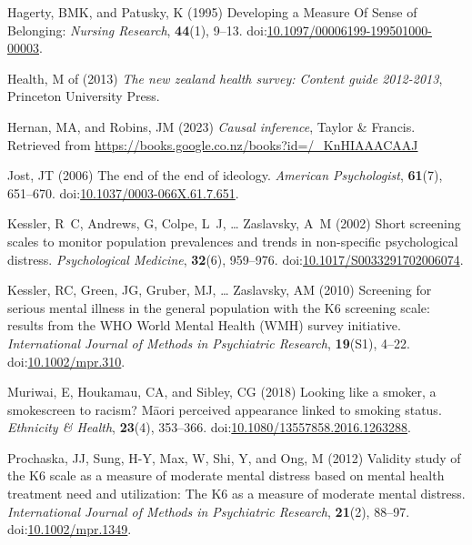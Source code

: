\documentclass[
  singlecolumn,
  9pt]{article}
\newlength{\cslhangindent}
\newenvironment{CSLReferences}[2] %
 {\begin{list}{}{%
  \setlength{\itemindent}{0pt}
  \setlength{\leftmargin}{0pt}
  \setlength{\parsep}{0pt}
  \ifodd #1
   \setlength{\leftmargin}{\cslhangindent}
   \setlength{\itemindent}{-1\cslhangindent}
  \fi
  \setlength{\itemsep}{#2\baselineskip}}}
 {\end{list}}
\begin{document}
\begin{CSLReferences}{1}{0}
Hagerty, BMK, and Patusky, K (1995) Developing a Measure Of Sense of
Belonging: \emph{Nursing Research}, \textbf{44}(1), 9--13.
doi:\href{https://doi.org/10.1097/00006199-199501000-00003}{10.1097/00006199-199501000-00003}.

Health, M of (2013) \emph{The new zealand health survey: Content guide
2012-2013}, Princeton University Press.

Hernan, MA, and Robins, JM (2023) \emph{Causal inference}, Taylor \&
Francis. Retrieved from
\url{https://books.google.co.nz/books?id=/_KnHIAAACAAJ}

Jost, JT (2006) The end of the end of ideology. \emph{American
Psychologist}, \textbf{61}(7), 651--670.
doi:\href{https://doi.org/10.1037/0003-066X.61.7.651}{10.1037/0003-066X.61.7.651}.

Kessler, R~C, Andrews, G, Colpe, L~J, \ldots{} Zaslavsky, A~M (2002)
Short screening scales to monitor population prevalences and trends in
non-specific psychological distress. \emph{Psychological Medicine},
\textbf{32}(6), 959--976.
doi:\href{https://doi.org/10.1017/S0033291702006074}{10.1017/S0033291702006074}.

Kessler, RC, Green, JG, Gruber, MJ, \ldots{} Zaslavsky, AM (2010)
Screening for serious mental illness in the general population with the
K6 screening scale: results from the WHO World Mental Health (WMH)
survey initiative. \emph{International Journal of Methods in Psychiatric
Research}, \textbf{19}(S1), 4--22.
doi:\href{https://doi.org/10.1002/mpr.310}{10.1002/mpr.310}.

Muriwai, E, Houkamau, CA, and Sibley, CG (2018) Looking like a smoker, a
smokescreen to racism? Māori perceived appearance linked to smoking
status. \emph{Ethnicity \& Health}, \textbf{23}(4), 353--366.
doi:\href{https://doi.org/10.1080/13557858.2016.1263288}{10.1080/13557858.2016.1263288}.

Prochaska, JJ, Sung, H-Y, Max, W, Shi, Y, and Ong, M (2012) Validity
study of the K6 scale as a measure of moderate mental distress based on
mental health treatment need and utilization: The K6 as a measure of
moderate mental distress. \emph{International Journal of Methods in
Psychiatric Research}, \textbf{21}(2), 88--97.
doi:\href{https://doi.org/10.1002/mpr.1349}{10.1002/mpr.1349}.


\end{CSLReferences}
\end{document}
